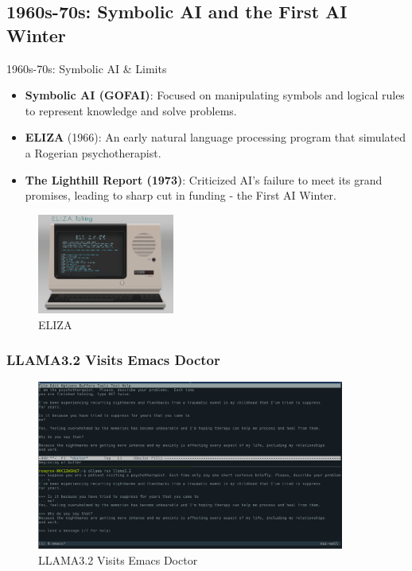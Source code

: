 \documentclass{beamer}
\begin{document}
\subsection{1960s-70s: Symbolic AI and the First AI Winter}

\begin{frame}[t]{1960s-70s: Symbolic AI \& Limits}
\begin{itemize}
    \item \textbf{Symbolic AI (GOFAI)}: Focused on manipulating symbols and logical rules to represent knowledge and solve problems.
    \item \textbf{ELIZA} (1966): An early natural language processing program that simulated a Rogerian psychotherapist.
    \item \textbf{The Lighthill Report (1973)}: Criticized AI's failure to meet its grand promises, leading to sharp cut in funding - the \alert{First AI Winter}.
\end{itemize}
\begin{figure}
    \includegraphics[width=0.4\textwidth]{images/eliza.png}
    \caption{ELIZA}
\end{figure}
\end{frame}

\begin{frame}[t]
    \frametitle{LLAMA3.2 Visits Emacs Doctor}
    
    \begin{figure}
    \begin{center}
        \includegraphics[width=0.9\textwidth]{images/doctor-llama.png}
    \end{center}
    \caption{LLAMA3.2 Visits Emacs Doctor}
    \end{figure}
    
\end{frame}
\end{document}
